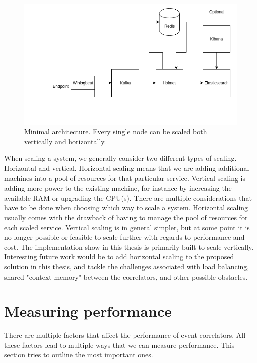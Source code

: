 \begin{figure}[h]  %
  \centering
  \includegraphics[width=.85\textwidth]{figures/holmes-architecture}
  \caption[An example figure.]{Minimal architecture. Every single node can be scaled both vertically and horizontally.}
  \label{fig:example}
\end{figure}
When scaling a system, we generally consider two different types of scaling. Horizontal and vertical. Horizontal scaling means that we are adding additional machines into a pool of resources for that particular service. Vertical scaling is adding more power to the existing machine, for instance by increasing the available RAM or upgrading the CPU(s).
There are multiple considerations that have to be done when choosing which way to scale a system. Horizontal scaling usually comes with the drawback of having to manage the pool of resources for each scaled service. Vertical scaling is in general simpler, but at some point it is no longer possible or feasible to scale further with regards to performance and cost.
The implementation show in this thesis is primarily built to scale vertically.
Interesting future work would be to add horizontal scaling to the proposed solution in this thesis, and tackle the challenges associated with load balancing, shared "context memory" between the correlators, and other possible obstacles.


\section{Measuring performance}
\label{sec:measuring-performance}
There are multiple factors that affect the performance of event correlators. All these factors lead to multiple ways that we can measure performance. This section tries to outline the most important ones.

